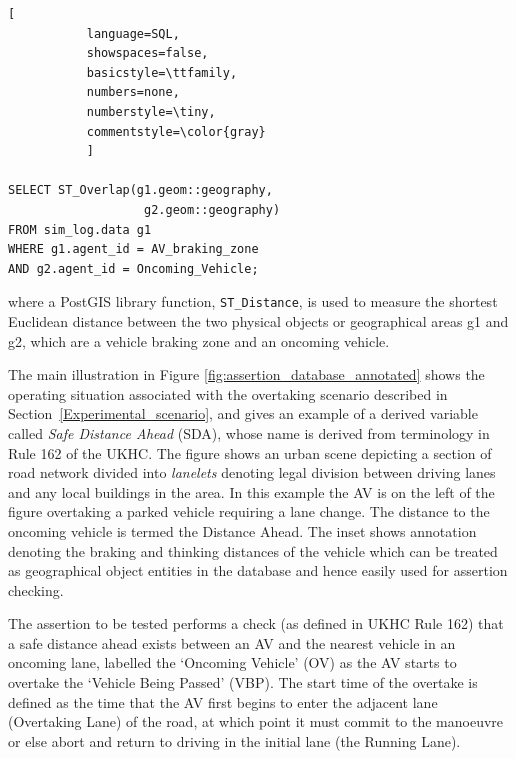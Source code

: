 \begin{lstlisting}[
           language=SQL,
           showspaces=false,
           basicstyle=\ttfamily,
           numbers=none,
           numberstyle=\tiny,
           commentstyle=\color{gray}
           ]
        
SELECT ST_Overlap(g1.geom::geography,
                   g2.geom::geography)
FROM sim_log.data g1
WHERE g1.agent_id = AV_braking_zone 
AND g2.agent_id = Oncoming_Vehicle;
\end{lstlisting} where a PostGIS library function,  \texttt{ST\_Distance}, is used to measure the shortest Euclidean distance between the two physical objects or geographical areas g1 and g2, which are a vehicle braking zone and an oncoming vehicle. 

The main illustration in Figure \ref{fig:assertion_database_annotated} shows the operating situation associated with the overtaking scenario described in Section~\ref{Experimental_scenario}, and gives an example of a derived variable called \emph{Safe Distance Ahead} (SDA), whose name is derived from terminology in Rule 162 of the UKHC. The figure shows an urban scene depicting a section of road network divided into \emph{lanelets} denoting legal division between driving lanes and any local buildings in the area. In this example the AV is on the left of the figure overtaking a parked vehicle requiring a lane change. The distance to the oncoming vehicle is termed the Distance Ahead. The inset shows annotation denoting the braking and thinking distances of the vehicle which can be treated as geographical object entities in the database and hence easily used for assertion checking. 

The assertion to be tested performs a check (as defined in UKHC Rule 162) that a safe distance ahead exists between an AV and the nearest vehicle in an oncoming lane, labelled the `Oncoming Vehicle' (OV) as the AV starts to overtake the `Vehicle Being Passed' (VBP). The start time of the overtake is defined as the time that the AV first begins to enter the adjacent lane (Overtaking Lane) of the road, at which point it must commit to the manoeuvre or else abort and return to driving in the initial lane (the Running Lane). 

